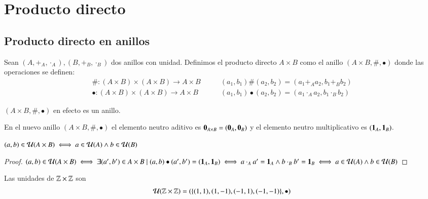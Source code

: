 \section{Producto directo}

\subsection{Producto directo en anillos}

\begin{dfn}
	Sean $(A, +_A, \cdot_A), (B, +_B, \cdot_B)$ dos anillos con unidad. Definimos el producto directo $A \times B$ como el anillo $(A \times B, \#, \bullet)$ donde las operaciones se definen:
	\begin{align*}
		\# : (A\times B) \times (A\times B) \to A \times B\qquad &(a_1, b_1) \# (a_2, b_2) = (a_1 +_A a_2, b_1 +_B b_2) \\
		\bullet : (A\times B) \times (A\times B) \to A \times B\qquad &(a_1, b_1) \bullet (a_2, b_2) = (a_1 \cdot_A a_2, b_1 \cdot_B b_2)
	\end{align*}
\end{dfn}

\begin{pro}
	$(A\times B, \#, \bullet)$ en efecto es un anillo.
\end{pro}

\begin{obs}
	En el nuevo anillo $(A\times B, \#, \bullet)$ el elemento neutro aditivo es $\mathbf{0}_{A\times B} = (\mathbf{0}_A, \mathbf{0}_B)$ y el elemento neutro multiplicativo es $(\mathbf{1}_A, \mathbf{1}_B)$.
\end{obs}

\begin{pro}
	$(a,b) \in \mathcal{U}(A \times B) \iff a \in \mathcal{U}(A) \land b \in \mathcal{U}(B)$
\end{pro}

\begin{proof}
	$(a,b) \in \mathcal{U}(A \times B) \iff \exists (a',b') \in A\times B \mid (a,b) \bullet (a', b') = (\mathbf{1}_A, \mathbf{1}_B) \iff a\cdot_A a' = \mathbf{1}_A \land b\cdot_B b' = \mathbf{1}_B \iff a \in \mathcal{U}(A) \land b \in \mathcal{U}(B)$
\end{proof}

\begin{ej}
	Las unidades de $\mathbb{Z} \times \mathbb{Z}$ son
	\begin{align*}
		\mathcal{U}(\mathbb{Z} \times \mathbb{Z}) = (\{(1,1), (1,-1), (-1,1), (-1,-1)\}, \bullet)
	\end{align*}
\end{ej}

